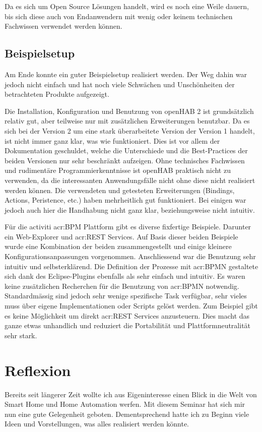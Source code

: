 Da es sich um Open Source Lösungen handelt, wird es noch eine Weile dauern, bis sich diese auch von Endanwendern mit wenig oder keinem technischen Fachwissen verwendet werden können.

\subsection{Beispielsetup}
Am Ende konnte ein guter Beispielsetup realisiert werden. Der Weg dahin war jedoch nicht einfach und hat noch viele Schwächen und Unschönheiten der betrachteten Produkte aufgezeigt.

Die Installation, Konfiguration und Benutzung von openHAB 2 ist grundsätzlich relativ gut, aber teilweise nur mit zusätzlichen Erweiterungen benutzbar. Da es sich bei der Version 2 um eine stark überarbeitete Version der Version 1 handelt, ist nicht immer ganz klar, was wie funktioniert. Dies ist vor allem der Dokumentation geschuldet, welche die Unterschiede und die Best-Practices der beiden Versionen nur sehr beschränkt aufzeigen. Ohne technisches Fachwissen und rudimentäre Programmierkenntnisse ist openHAB praktisch nicht zu verwenden, da die interessanten Anwendungsfälle nicht ohne diese nicht realisiert werden können. Die verwendeten und getesteten Erweiterungen (Bindings, Actions, Peristence, etc.) haben mehrheitlich gut funktioniert. Bei einigen war jedoch auch hier die Handhabung nicht ganz klar, beziehungsweise nicht intuitiv.

Für die activiti \gls{acr:BPM} Plattform gibt es diverse fixfertige Beispiele. Darunter ein Web-Explorer und \gls{acr:REST} Services. Auf Basis dieser beiden Beispiele wurde eine Kombination der beiden zusammengestellt und einige kleinere Konfigurationsanpassungen vorgenommen. Anschliessend war die Benutzung sehr intuitiv und selbsterklärend. Die Definition der Prozesse mit \gls{acr:BPMN} gestaltete sich dank des Eclipse-Plugins ebenfalls als sehr einfach und intuitiv. Es waren keine zusätzlichen Recherchen für die Benutzung von \gls{acr:BPMN} notwendig. Standardmässig sind jedoch sehr wenige spezifische Task verfügbar, sehr vieles muss über eigene Implementationen oder Scripts gelöst werden. Zum Beispiel gibt es keine Möglichkeit um direkt \gls{acr:REST} Services anzusteuern. Dies macht das ganze etwas unhandlich und reduziert die Portabilität und Plattformneutralität sehr stark.


\section{Reflexion}
Bereits seit längerer Zeit wollte ich aus Eigeninteresse einen Blick in die Welt von Smart Home und Home Automation werfen. Mit diesem Seminar hat sich mir nun eine gute Gelegenheit geboten. Dementsprechend hatte ich zu Beginn viele Ideen und Vorstellungen, was alles realisiert werden könnte.

